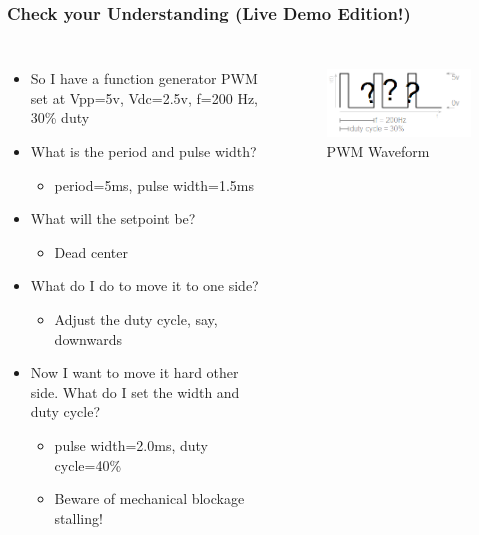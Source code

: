 \documentclass{beamer}
\begin{document}
\begin{frame}
\frametitle{Check your Understanding {\small (Live Demo Edition!)}}
\begin{columns}[t]
\begin{itemize}
  \item So I have a function generator PWM set at Vpp=5v, Vdc=2.5v, f=200 Hz, 30\% duty
  \item What is the period and pulse width?
  \begin{itemize}
    \item<2-> period=5ms, pulse width=1.5ms
  \end{itemize}
  \item What will the setpoint be?
  \begin{itemize}
    \item<3-> Dead center
  \end{itemize}
  \item What do I do to move it to one side?
  \begin{itemize}
    \item<4-> Adjust the duty cycle, say, downwards
  \end{itemize}
  \item Now I want to move it hard other side. What do I set the width and duty cycle?
  \begin{itemize}
    \item<5-> pulse width=2.0ms, duty cycle=40\%
    \item<5-> Beware of mechanical blockage stalling!
  \end{itemize}
\end{itemize}

\begin{figure}
  \centering
  \includegraphics[width=1.0\columnwidth]{images-dis3/pwmwave-questions} \\
  PWM Waveform
\end{figure}
\end{columns}
\end{frame}
\end{document}
